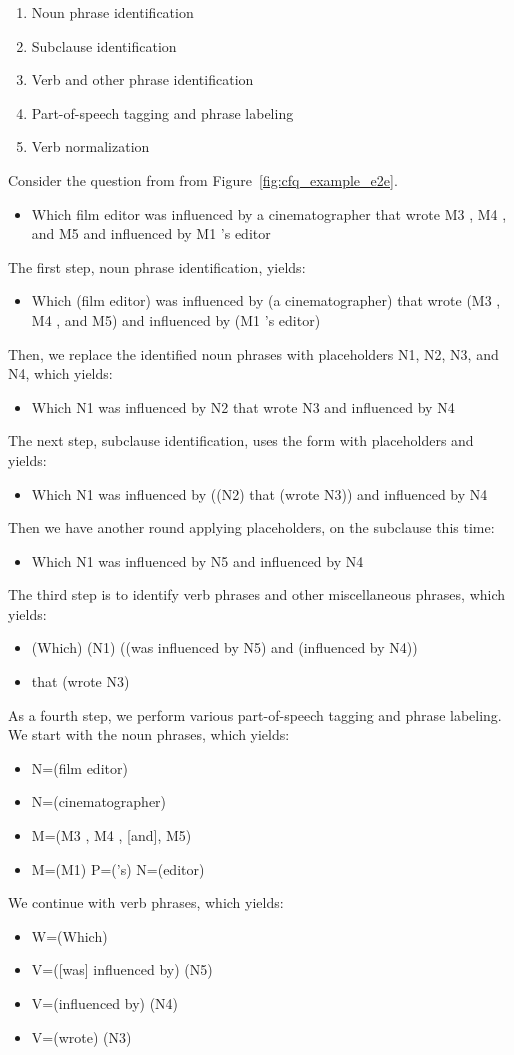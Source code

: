 \documentclass{article} \usepackage{iclr2022_conference,times}
\newcommand{\example}[1]{\begin{itemize} #1 \end{itemize}}
\newcommand{\ex}{\item}
\begin{document}
\begin{enumerate}
    \item Noun phrase identification
    \item Subclause identification
    \item Verb and other phrase identification
    \item Part-of-speech tagging and phrase labeling
    \item Verb normalization
\end{enumerate}

Consider the question from from Figure~\ref{fig:cfq_example_e2e}.

\example{\ex Which film editor was influenced by a cinematographer that wrote M3 , M4 , and M5 and influenced by M1 's editor}

The first step, noun phrase identification, yields:

\example{\ex Which (film editor) was influenced by (a cinematographer) that wrote (M3 , M4 , and M5) and influenced by (M1 's editor)}

Then, we replace the identified noun phrases with placeholders N1, N2, N3, and N4, which yields:

\example{\ex Which N1 was influenced by N2 that wrote N3 and influenced by N4}

The next step, subclause identification, uses the form with placeholders and yields:

\example{\ex Which N1 was influenced by ((N2) that (wrote N3)) and influenced by N4}

Then we have another round applying placeholders, on the subclause this time:

\example{\ex Which N1 was influenced by N5 and influenced by N4}

The third step is to identify verb phrases and other miscellaneous phrases, which yields:

\example{
\ex (Which) (N1) ((was influenced by N5) and (influenced by N4))
\ex that (wrote N3)
}

As a fourth step, we perform various part-of-speech tagging and phrase labeling. We start with the noun phrases, which yields:

\example{
\ex N=(film editor)
\ex \text{[a]} N=(cinematographer)
\ex M=(M3 , M4 , [and], M5)
\ex M=(M1) P=('s) N=(editor)
}

We continue with verb phrases, which yields:

\example{
\ex W=(Which)
\ex V=([was] influenced by) (N5)
\ex V=(influenced by) (N4)
\ex V=(wrote) (N3)
}
\end{document}
